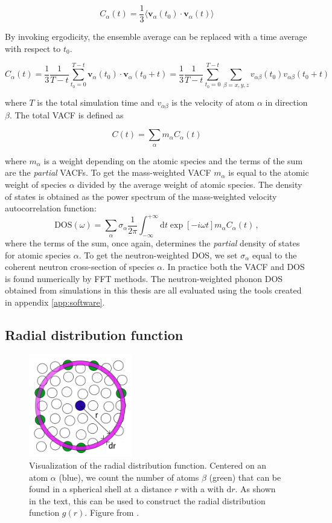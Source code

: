 \[ C_\alpha(t) = \frac{1}{3} \langle \bm{v}_\alpha(t_0) \cdot \bm{v}_\alpha(t) \rangle \]

\noindent By invoking ergodicity, the ensemble average can be replaced with a time average with respect to $t_0$.

\[ C_\alpha(t) = \frac{1}{3} \frac{1}{T-t} \sum_{t_0=0}^{T-t} \bm{v}_\alpha(t_0) \cdot \bm{v}_\alpha(t_0 + t) = \frac{1}{3} \frac{1}{T-t} \sum_{t_0=0}^{T-t} \sum_{\beta=x,y,z} v_{\alpha\beta}(t_0) v_{\alpha\beta}(t_0 + t) \]

\noindent where $T$ is the total simulation time and $v_{\alpha\beta}$ is the velocity of atom $\alpha$ in direction $\beta$. The total VACF is defined as

\[ C(t) = \sum_\alpha m_\alpha C_\alpha(t) \]

\noindent where $m_\alpha$ is a weight depending on the atomic species and the terms of the sum are the \emph{partial} VACFs. To get the mass-weighted VACF $m_\alpha$ is equal to the atomic weight of species $\alpha$ divided by the average weight of atomic species. The density of states is obtained as the power spectrum of the mass-weighted velocity autocorrelation function:
%
\[ \text{DOS}(\omega) = \sum_\alpha \sigma_\alpha \frac{1}{2\pi} \int^{+\infty}_{-\infty} \mathrm{d}t \exp[-i\omega t] m_\alpha C_\alpha(t) \, , \]
%
where the terms of the sum, once again, determines the \emph{partial} density of states for atomic species $\alpha$. To get the neutron-weighted DOS, we set $\sigma_\alpha$ equal to the coherent neutron cross-section of species $\alpha$. In practice both the VACF and DOS is found numerically by FFT methods. The neutron-weighted phonon DOS obtained from simulations in this thesis are all evaluated using the tools created in appendix \ref{app:software}.

\subsection{Radial distribution function}

\begin{figure}
	\centering
	\includegraphics[width=0.4\textwidth]{fig/temp/gr.png}
	\caption[RDF visualization]{Visualization of the radial distribution function. Centered on an atom $\alpha$ (blue), we count the number of atoms $\beta$ (green) that can be found in a spherical shell at a distance $r$ with a with $\mathrm{d}r$. As shown in the text, this can be used to construct the radial distribution function $g(r)$. Figure from \cite{website:rdf}.}
	\label{fig:rdf}
\end{figure}

